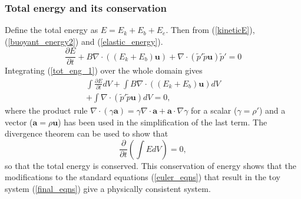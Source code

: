 \documentclass[times]{qjrms4}
\begin{document}
\subsubsection{Total energy and its conservation} %

Define the total energy as $E = E_k + E_b + E_e$. Then from (\ref{kineticE}), 
(\ref{buoyant_energy2}) and (\ref{elastic_energy}).
\begin{equation} \label{tot_eng_1}
\frac{\partial E}{\partial t} + B \nabla \cdot ((E_k + E_b)\mathbf u) + 
\nabla \cdot \left( \tilde{p}' \tilde{p} \mathbf u \right)\tilde{p}'  = 0
\end{equation}
Integrating  (\ref{tot_eng_1}) over the whole domain gives
\begin{eqnarray} \label{first_int}
\int \frac{\partial E}{\partial t} dV + \int B \nabla \cdot (( E_k + E_b ) \mathbf u ) dV \nonumber \\
+ \int \nabla \cdot \left( \tilde{p}' \tilde{p} \mathbf u \right) dV  = 0,
\end{eqnarray}
where the product rule 
$\nabla \cdot (\gamma \mathbf a) = \gamma \nabla \cdot \mathbf a + \mathbf a \cdot \nabla \gamma$ 
for a scalar ($\gamma = \rho'$) and a vector ($\mathbf a = \rho \mathbf u$) has been used in the 
simplification of the last term. 
The divergence theorem can be used to show that
\begin{equation}
\frac{\partial}{\partial t} \left( \int E dV \right) = 0,
\end{equation}
so that the total energy is conserved. This conservation of energy shows that the 
modifications to the standard equations (\ref{euler_eqns}) that result in the toy system 
(\ref{final_eqns}) give a physically consistent system. 

\end{document}
